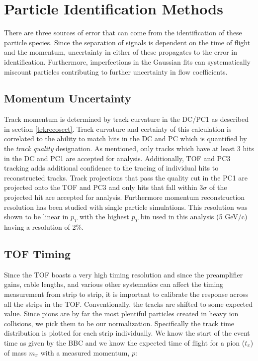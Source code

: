 \section{Particle Identification Methods}
\label{sectpiderr}
There are three sources of error that can come from the identification of these particle species. Since the separation of signals is dependent on the time of flight and the momentum, uncertainty in either of these propagates to the error in identification. Furthermore, imperfections in the Gaussian fits can systematically miscount particles contributing to further uncertainty in flow coefficients.

\subsection{Momentum Uncertainty}
Track momentum is determined by track curvature in the DC/PC1 as described in section \ref{trkrecosect}. Track curvature and certainty of this calculation is correlated to the ability to match hits in the DC and PC which is quantified by the \textit{track quality} designation. As mentioned, only tracks which have at least 3 hits in the DC and PC1 are accepted for analysis. Additionally, TOF and PC3 tracking adds additional confidence to the tracing of individual hits to reconstructed tracks. Track projections that pass the quality cut in the PC1 are projected onto the TOF and PC3 and only hits that fall within $3\sigma$ of the projected hit are accepted for analysis. Furthermore momentum reconstruction resolution has been studied with single particle simulations\citep{Mitchell:2002wu}. This resolution was shown to be linear in $p_T$ with the highest $p_T$ bin used in this analysis (5 GeV/c) having a resolution of 2\%.
 
\subsection{TOF Timing}
Since the TOF boasts a very high timing resolution and since the preamplifier gains, cable lengths, and various other systematics can affect the timing measurement from strip to strip, it is important to calibrate the response across all the strips in the TOF. Conventionally, the tracks are shifted to some expected value. Since pions are by far the most plentiful particles created in heavy ion collisions, we pick them to be our normalization. Specifically the track time distribution is plotted for each strip individually. We know the start of the event time as given by the BBC and we know the expected time of flight for a pion ($t_{\pi}$) of mass $m_{\pi}$ with a measured momentum, $p$:

